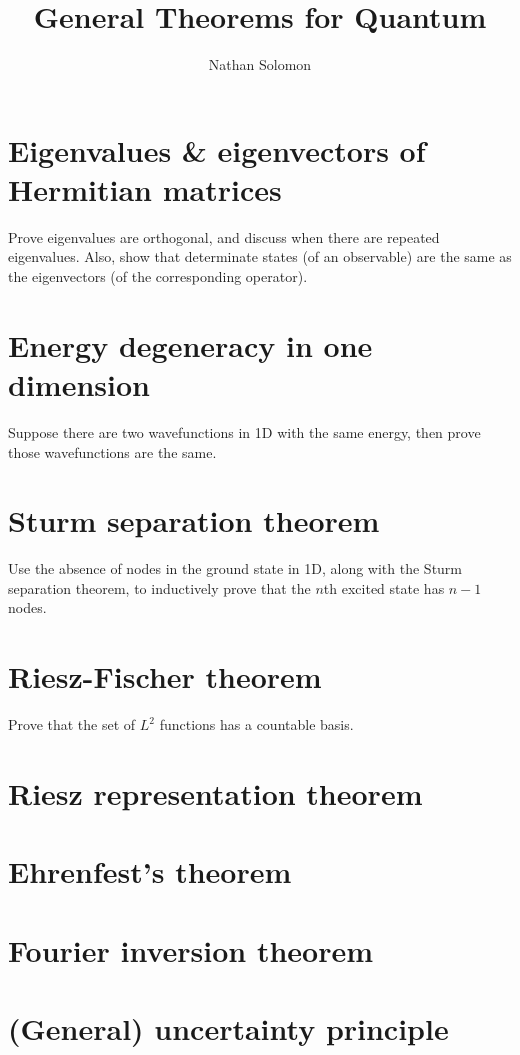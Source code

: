 \documentclass[12pt]{article}
\begin{document}
\title{General Theorems for Quantum}
\author{Nathan Solomon}
\maketitle

\tableofcontents

\section{Eigenvalues \& eigenvectors of Hermitian matrices}
Prove eigenvalues are orthogonal, and discuss when there are repeated eigenvalues. Also, show that determinate states (of an observable) are the same as the eigenvectors (of the corresponding operator).

\section{Energy degeneracy in one dimension}
Suppose there are two wavefunctions in 1D with the same energy, then prove those wavefunctions are the same.

\section{Sturm separation theorem}
Use the absence of nodes in the ground state in 1D, along with the Sturm separation theorem, to inductively prove that the $n$th excited state has $n-1$ nodes.

\section{Riesz-Fischer theorem}
Prove that the set of $L^2$ functions has a countable basis.

\section{Riesz representation theorem}

\section{Ehrenfest's theorem}

\section{Fourier inversion theorem}

\section{(General) uncertainty principle}
\end{document}
